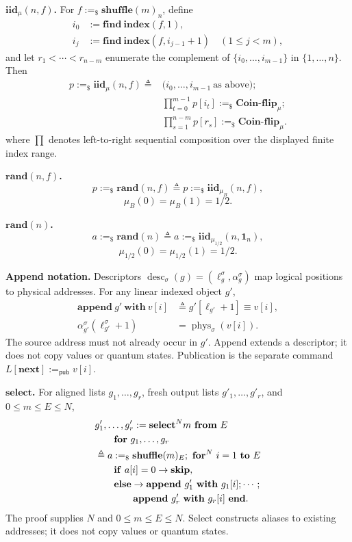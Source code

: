 \documentclass[conference,compsoc]{IEEEtran}
\begin{document}
\smallskip
\noindent\textbf{\(\mathbf{iid}_{\mu}(n,f)\).}
For \(f:=_{\$}\mathbf{shuffle}(m)_n\), define
\[
\begin{aligned}
i_0&:=\mathbf{find\ index}(f,1),\\
i_j&:=\mathbf{find\ index}(f,i_{j-1}+1)
\quad(1\le j<m),
\end{aligned}
\]
and let \(r_1<\cdots<r_{n-m}\) enumerate the complement of
\(\{i_0,\ldots,i_{m-1}\}\) in \(\{1,\ldots,n\}\). Then
\[
\begin{aligned}
p:=_{\$}\mathbf{iid}_{\mu}(n,f)
\triangleq{}&
\bigl(i_0,\ldots,i_{m-1}\ \text{as above}\bigr);\\
&\prod_{t=0}^{m-1}
p[i_t]:=_{\$}\mathbf{Coin\mbox{-}flip}_{\mu};\\
&\prod_{s=1}^{n-m}
p[r_s]:=_{\$}\mathbf{Coin\mbox{-}flip}_{\mu}.
\end{aligned}
\]
where \(\prod\) denotes left-to-right sequential composition over the displayed
finite index range.

\smallskip
\noindent\textbf{\(\mathbf{rand}(n,f)\).}
\[
p:=_{\$}\mathbf{rand}(n,f)\triangleq
p:=_{\$}\mathbf{iid}_{\mu_B}(n,f),\]\[
\mu_B(0)=\mu_B(1)=1/2.
\]

\smallskip
\noindent\textbf{\(\mathbf{rand}(n)\).}
\[
a:=_\$\mathbf{rand}(n)\triangleq
a:=_\$\mathbf{iid}_{\mu_{1/2}}(n,\mathbf 1_n),\]\[
\mu_{1/2}(0)=\mu_{1/2}(1)=1/2 .
\]

\smallskip
\noindent\textbf{Append notation.}
Descriptors \(\operatorname{desc}_{\sigma}(g)=(\ell_g^\sigma,\alpha_g^\sigma)\)
map logical positions to physical addresses. For any linear indexed object
\(g'\),
\[
\begin{aligned}
\mathbf{append}\ g'\ \mathbf{with}\ v[i]
&\triangleq g'[\ell_{g'}+1]\equiv v[i],\\
\alpha_{g'}^\sigma(\ell_{g'}^\sigma+1)
&=\operatorname{phys}_{\sigma}(v[i]).
\end{aligned}
\]
The source address must not already occur in \(g'\). Append extends a
descriptor; it does not copy values or quantum states. Publication is the
separate command \(L[\mathbf{next}]:=_{\mathsf{pub}}v[i]\).

\smallskip
\noindent\textbf{\(\mathbf{select}\).}
For aligned lists \(g_1,\ldots,g_r\), fresh output lists \(g'_1,\ldots,g'_r\),
and \(0\le m\le E\le N\),
\[
\begin{aligned}
&g'_1,\ldots,g'_r :=
\mathbf{select}^{N} m\ \mathbf{from}\ E\\
&\hspace{2.0em}\mathbf{for}\ g_1,\ldots,g_r\\
&\triangleq
a:=_{\$}\mathbf{shuffle}(m)_E;\
\mathbf{for}^{N}\ i=1\ \mathbf{to}\ E\\
&\qquad
\mathbf{if}\ a[i]=0\to\mathbf{skip},\\
&\qquad
\mathbf{else}\to
\mathbf{append}\ g'_1\ \mathbf{with}\ g_1[i];\cdots;\\
&\qquad\qquad
\mathbf{append}\ g'_r\ \mathbf{with}\ g_r[i]\ \mathbf{end}.
\end{aligned}
\]
The proof supplies \(N\) and \(0\le m\le E\le N\). Select constructs aliases to
existing addresses; it does not copy values or quantum states.
\end{document}
